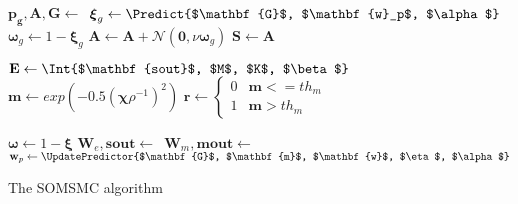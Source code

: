 \documentclass[a4paper]{article}
\begin{document}
\begin{algorithm}[H]
{{        \BlankLine
              
    	$\mathbf{p_g}, \mathbf{A},\mathbf{G}\leftarrow$\,\;  
        $\boldsymbol{\xi}_{g}\leftarrow\Predict{$\mathbf{G}$, $\mathbf{w}_p$, $\alpha$}$\;
        $\boldsymbol{\omega}_{g}\leftarrow 1 - \boldsymbol{\xi}_{g}$\;
        $\mathbf{A}\leftarrow\mathbf{A} + \mathcal{N}(\mathbf{0}, \nu\boldsymbol{\omega}_{g})$\; 
        $\mathbf{S}\leftarrow\mathbf{A}$\;
        
        \BlankLine
             

                
        \BlankLine
          
        $\mathbf{E}\leftarrow\Int{$\mathbf{sout}$, $M$, $K$, $\beta$}$\;
		$\mathbf{m} \leftarrow exp(-0.5(\boldsymbol{\chi}\rho^{-1})^2)$\;
		$\mathbf{r} \leftarrow  \begin{cases}
									0  &  \mathbf{m} <= th_{m}\\
									1  &  \mathbf{m} > th_{m}
								\end{cases}$\;
                   
        \BlankLine
        $\boldsymbol{\omega}\leftarrow 1-\boldsymbol{\xi}$\;
        $\mathbf{W}_e,\mathbf{sout}\leftarrow$\,\;
        $\mathbf{W}_m,\mathbf{mout}\leftarrow$\,\;       
        $\mathbf{w}_p\leftarrow\UpdatePredictor{$\mathbf{G}$, $\mathbf{m}$, $\mathbf{w}$, $\eta$, $\alpha$}$\;
                            
        \BlankLine
          
    }
}
\caption{The SOMSMC algorithm}\label{smc3}
\end{algorithm}
\DecMargin{1em}
\end{document}

